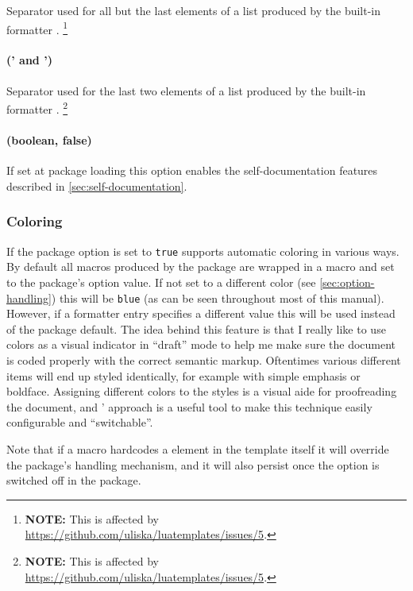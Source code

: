 \documentclass{scrartcl}
\begin{document}
Separator used for all but the last elements of a list produced by the built-in formatter
.%
\footnote{\textbf{NOTE:} This is affected by
\url{https://github.com/uliska/luatemplates/issues/5}.}


\paragraph{ (' and ')}

Separator used for the last two elements of a list produced by the built-in formatter
.%
\footnote{\textbf{NOTE:} This is affected by
\url{https://github.com/uliska/luatemplates/issues/5}.}


\paragraph{ (boolean, false)}

If set at package loading this option enables the self-documentation features
described in \vref{sec:self-documentation}.


\subsubsection{Coloring}
\label{sec:coloring}

If the package option  is set to \texttt{true}
 supports automatic coloring in various ways.  By default
all macros produced by the package are wrapped in a  macro and
set to the package's  option value.  If not set to a
different color (see \vref{sec:option-handling}) this will be \texttt{blue}
(as can be seen throughout most of this manual).  However, if a formatter entry
specifies a different  value this will be used instead of the
package default.  The idea behind this feature is that I really like to use
colors as a visual indicator in “draft” mode to help me make sure the document
is coded properly with the correct semantic markup.  Oftentimes various
different items will end up styled identically, for example with simple emphasis
or boldface.  Assigning different colors to the styles is a visual aide for
proofreading the document, and ' approach is a useful tool
to make this technique easily configurable and “switchable”.

Note that if a macro hardcodes a  element in the template itself
it will override the package's handling mechanism, and it will also persist once
the  option is switched off in the package.
\end{document}
